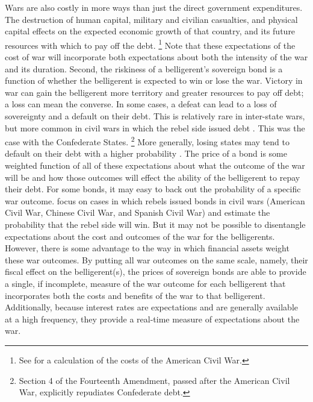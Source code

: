 Wars are also costly in more ways than just the direct government expenditures.
The destruction of human capital, military and civilian casualties, and physical capital effects on the expected economic growth of that country, and its future resources with which to pay off the debt.%
\footnote{See \textcite{GoldinLewis1975} for a calculation of the costs of the American Civil War.}
Note that these expectations of the cost of war will incorporate both expectations about both the intensity of the war and its duration.
Second, the riskiness of a belligerent's sovereign bond is a function of whether the belligerent is expected to win or lose the war.
Victory in war can gain the belligerent more territory and greater resources to pay off debt; a loss can mean the converse.
In some cases, a defeat can lead to a loss of sovereignty and a default on their debt.
This is relatively rare in inter-state wars, but more common in civil wars in which the rebel side issued debt \parencite{HaberMitchenerOosterlinckEtAl2015}.
This was the case with the Confederate States.%
\footnote{Section 4 of the Fourteenth Amendment, passed after the American Civil War, explicitly repudiates Confederate debt.}
More generally, losing states may tend to default on their debt with a higher probability \parencite{Slantchev2012a}.
The price of a bond is some weighted function of all of these expectations about what the outcome of the war will be and how those outcomes will effect the ability of the belligerent to repay their debt.
For some bonds, it may easy to back out the probability of a specific war outcome.
\textcite{HaberMitchenerOosterlinckEtAl2015} focus on cases in which rebels issued bonds in civil wars (American Civil War, Chinese Civil War, and Spanish Civil War) and estimate the probability that the rebel side will win.
But it may not be possible to disentangle expectations about the cost and outcomes of the war for the belligerents.
However, there is some advantage to the way in which financial assets weight these war outcomes.
By putting all war outcomes on the same scale, namely, their fiscal effect on the belligerent(s), the prices of sovereign bonds are able to provide a single, if incomplete, measure of the war outcome for each belligerent that incorporates both the costs and benefits of the war to that belligerent.
Additionally, because interest rates are expectations and are generally available at a high frequency, they provide a real-time measure of expectations about the war.
